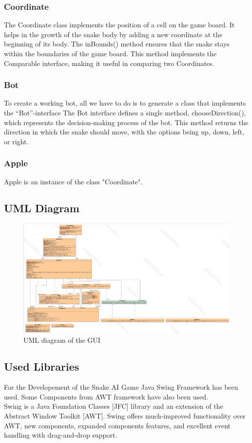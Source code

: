 \documentclass[a4paper,12pt]{article}
\begin{document}
\subsubsection{Coordinate}
The Coordinate class implements the position of a cell on the game board. It helps in the growth of the snake body by adding a new coordinate at the beginning of its body.
The inBounds() method ensures that the snake stays within the boundaries of the game board. This method implements the Comparable interface, making it useful in comparing two Coordinates. 
\subsubsection{Bot}
To create a working bot, all we have to do is to generate a class that implements the “Bot”-interface
The Bot interface defines a single method, chooseDirection(), which represents the decision-making process of the bot.
This method returns the direction in which the snake should move, with the options being up, down, left, or right.
\subsubsection{Apple}
Apple is an instance of the class "Coordinate".
\subsection{UML Diagram}

\begin{figure}[h]
\centering
\includegraphics[scale=0.26]{ui.png}
\caption{UML diagram of the GUI}
\end{figure}

\subsection{Used Libraries}
For the Developement of the Snake AI Game Java Swing Framework has been used.
Some Components from AWT framework have also been used.\\ 
Swing is a Java Foundation Classes [JFC] library and an extension of the Abstract Window Toolkit [AWT].
Swing offers much-improved functionality over AWT, new components, expanded components features, and excellent event handling with drag-and-drop support.\cite{awt}
\end{document}
